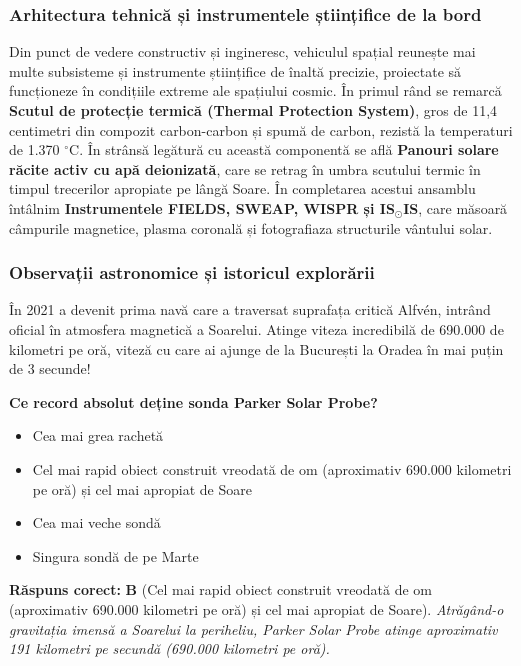 \subsubsection*{Arhitectura tehnică și instrumentele științifice de la bord}
Din punct de vedere constructiv și ingineresc, vehiculul spațial reunește mai multe subsisteme și instrumente științifice de înaltă precizie, proiectate să funcționeze în condițiile extreme ale spațiului cosmic. În primul rând se remarcă \textbf{Scutul de protecție termică (Thermal Protection System)}, gros de 11,4 centimetri din compozit carbon-carbon și spumă de carbon, rezistă la temperaturi de 1.370 $^\circ$C. În strânsă legătură cu această componentă se află \textbf{Panouri solare răcite activ cu apă deionizată}, care se retrag în umbra scutului termic în timpul trecerilor apropiate pe lângă Soare. În completarea acestui ansamblu întâlnim \textbf{Instrumentele FIELDS, SWEAP, WISPR și IS$_\odot$IS}, care măsoară câmpurile magnetice, plasma coronală și fotografiaza structurile vântului solar.

\subsubsection*{Observații astronomice și istoricul explorării}
În 2021 a devenit prima navă care a traversat suprafața critică Alfvén, intrând oficial în atmosfera magnetică a Soarelui. Atinge viteza incredibilă de 690.000 de kilometri pe oră, viteză cu care ai ajunge de la București la Oradea în mai puțin de 3 secunde!

\vspace{6pt}
\begin{tcolorbox}[orbitarquiz, title={\textbf{Întrebare de verificare \#50: Parker Solar Probe}}]
\textbf{Ce record absolut deține sonda Parker Solar Probe?}
\begin{itemize}[leftmargin=2.2em, itemsep=2pt, topsep=4pt]
  \item[$\square$ \textbf{A.}] Cea mai grea rachetă
  \item[$\square$ \textbf{B.}] Cel mai rapid obiect construit vreodată de om (aproximativ 690.000 kilometri pe oră) și cel mai apropiat de Soare
  \item[$\square$ \textbf{C.}] Cea mai veche sondă
  \item[$\square$ \textbf{D.}] Singura sondă de pe Marte
\end{itemize}
\vspace{2pt}
{\footnotesize\color{orbitarMuted}\textbf{Răspuns corect:} \textbf{B} (Cel mai rapid obiect construit vreodată de om (aproximativ 690.000 kilometri pe oră) și cel mai apropiat de Soare). \emph{Atrăgând-o gravitația imensă a Soarelui la periheliu, Parker Solar Probe atinge aproximativ 191 kilometri pe secundă (690.000 kilometri pe oră).}}
\end{tcolorbox}
\clearpage


